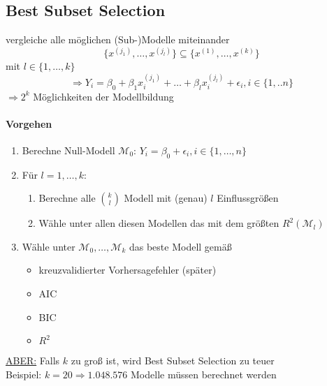 \subsection{Best Subset Selection}
vergleiche alle möglichen (Sub-)Modelle miteinander
\[ \{ x^{(j_1)},\dots, x^{(j_l)}\} \subseteq \{x^{(1)}, \dots, x^{(k)} \} \]
mit 
$l \in \{1, \dots, k \} $
\[ \Rightarrow Y_i = \beta_0 + \beta_1 x_i^{(j_1)} + \dots + \beta_l x_i^{(j_l)} + \epsilon_i , i \in \{1,..n\} \]
$\Rightarrow 2^{k} $ Möglichkeiten der Modellbildung
\paragraph{Vorgehen}
\begin{enumerate}
	\item Berechne Null-Modell $\mathcal{M}_0 $:
		$Y_i= \beta_0 + \epsilon_i , i \in \{1,\dots,n\} $
	\item Für $l=1,\dots,k$:
		\begin{enumerate}
			\item Berechne alle $\binom{k}{l}$ Modell mit (genau) $l$ Einflussgrößen
			\item Wähle unter allen diesen Modellen das mit dem größten $R^{2} (\mathcal{M}_l)$
		\end{enumerate}
	\item Wähle unter $\mathcal{M}_0,\dots,\mathcal{M}_k$ das beste Modell gemäß
		\begin{itemize}
			\item kreuzvalidierter Vorhersagefehler (später)
			\item AIC
			\item BIC
			\item $R^2$
		\end{itemize}
\end{enumerate}
\underline{ABER:} Falls $k$ zu groß ist, wird Best Subset Selection zu teuer \\
Beispiel: $k=20 \Rightarrow 1.048.576$ Modelle müssen berechnet werden

